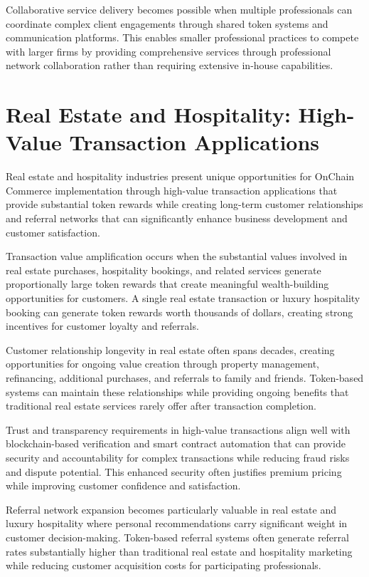 \documentclass[
  Letterpaper,
]{scrbook}
\begin{document}
Collaborative service delivery becomes possible when multiple
professionals can coordinate complex client engagements through shared
token systems and communication platforms. This enables smaller
professional practices to compete with larger firms by providing
comprehensive services through professional network collaboration rather
than requiring extensive in-house capabilities.

\section{Real Estate and Hospitality: High-Value Transaction
Applications}\label{real-estate-and-hospitality-high-value-transaction-applications}

Real estate and hospitality industries present unique opportunities for
OnChain Commerce implementation through high-value transaction
applications that provide substantial token rewards while creating
long-term customer relationships and referral networks that can
significantly enhance business development and customer satisfaction.

Transaction value amplification occurs when the substantial values
involved in real estate purchases, hospitality bookings, and related
services generate proportionally large token rewards that create
meaningful wealth-building opportunities for customers. A single real
estate transaction or luxury hospitality booking can generate token
rewards worth thousands of dollars, creating strong incentives for
customer loyalty and referrals.

Customer relationship longevity in real estate often spans decades,
creating opportunities for ongoing value creation through property
management, refinancing, additional purchases, and referrals to family
and friends. Token-based systems can maintain these relationships while
providing ongoing benefits that traditional real estate services rarely
offer after transaction completion.

Trust and transparency requirements in high-value transactions align
well with blockchain-based verification and smart contract automation
that can provide security and accountability for complex transactions
while reducing fraud risks and dispute potential. This enhanced security
often justifies premium pricing while improving customer confidence and
satisfaction.

Referral network expansion becomes particularly valuable in real estate
and luxury hospitality where personal recommendations carry significant
weight in customer decision-making. Token-based referral systems often
generate referral rates substantially higher than traditional real
estate and hospitality marketing while reducing customer acquisition
costs for participating professionals.
\end{document}
